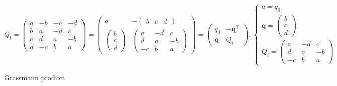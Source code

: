 \documentclass[
]{book}
\theoremstyle{definition}
\theoremstyle{definition}
\theoremstyle{definition}
\theoremstyle{definition}
\theoremstyle{remark}
\begin{document}
\[
Q_{{\scriptscriptstyle l}}=\begin{pmatrix}a & -b & -c & -d\\
b & a & -d & c\\
c & d & a & -b\\
d & -c & b & a
\end{pmatrix}=\begin{pmatrix}a & -\begin{pmatrix}b & c & d\end{pmatrix}\\
\begin{pmatrix}b\\
c\\
d
\end{pmatrix} & \begin{pmatrix}a & -d & c\\
d & a & -b\\
-c & b & a
\end{pmatrix}
\end{pmatrix}=\begin{pmatrix}q_{{\scriptscriptstyle 0}} & -\boldsymbol{q}^{\intercal}\\
\boldsymbol{q} & Q_{{\scriptscriptstyle i}}
\end{pmatrix},\begin{cases}
a=q_{{\scriptscriptstyle 0}}\\
\boldsymbol{q}=\begin{pmatrix}b\\
c\\
d
\end{pmatrix}\\
Q_{{\scriptscriptstyle i}}=\begin{pmatrix}a & -d & c\\
d & a & -b\\
-c & b & a
\end{pmatrix}
\end{cases}
\]

Grassmann product
\end{document}
